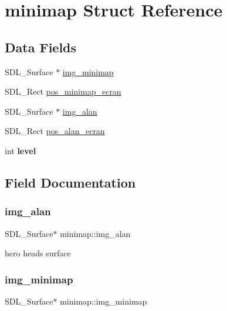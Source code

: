 \hypertarget{structminimap}{}\section{minimap Struct Reference}
\label{structminimap}
\subsection*{Data Fields}
\begin{DoxyCompactItemize}
\item 
S\+D\+L\+\_\+\+Surface $\ast$ \hyperlink{structminimap_adb3dfac4cd9492008be281c940ebed29}{img\+\_\+minimap}
\item 
S\+D\+L\+\_\+\+Rect \hyperlink{structminimap_a402dcb23bc8c2d4077c0773579ef6606}{pos\+\_\+minimap\+\_\+ecran}
\item 
S\+D\+L\+\_\+\+Surface $\ast$ \hyperlink{structminimap_a0df667e0426a2908be3a8a7f7a274be7}{img\+\_\+alan}
\item 
S\+D\+L\+\_\+\+Rect \hyperlink{structminimap_a2e69532c0a618345744010f7605e3f80}{pos\+\_\+alan\+\_\+ecran}
\item 
\mbox{\label{structminimap_a90748afb1d9cb128247905d0106a6337}} 
int {\bfseries level}
\end{DoxyCompactItemize}


\subsection{Field Documentation}
\mbox{\label{structminimap_a0df667e0426a2908be3a8a7f7a274be7}} 
\subsubsection{\texorpdfstring{img\+\_\+alan}{img\_alan}}
{\footnotesize\ttfamily S\+D\+L\+\_\+\+Surface$\ast$ minimap\+::img\+\_\+alan}

hero head\textquotesingle{}s surface \mbox{\label{structminimap_adb3dfac4cd9492008be281c940ebed29}} 
\subsubsection{\texorpdfstring{img\+\_\+minimap}{img\_minimap}}
{\footnotesize\ttfamily S\+D\+L\+\_\+\+Surface$\ast$ minimap\+::img\+\_\+minimap}

